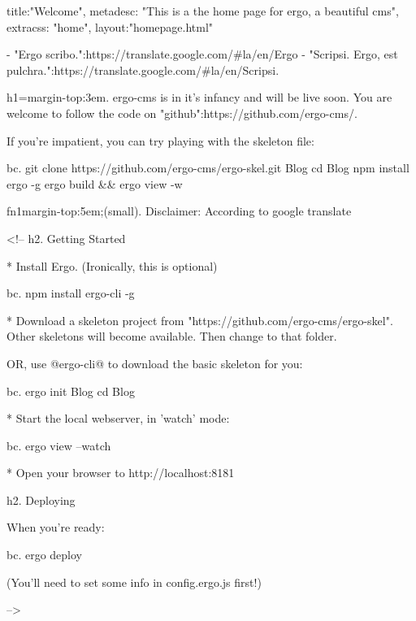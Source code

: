 {
title:"Welcome",
metadesc: "This is a the home page for ergo, a beautiful cms",
extracss: "home",
layout:"homepage.html"
}


- "Ergo scribo.":https://translate.google.com/#la/en/Ergo%
- "Scripsi. Ergo, est pulchra.":https://translate.google.com/#la/en/Scripsi.%


h1={margin-top:3em}. ergo-cms is in it's infancy and will be live soon. You are welcome to follow the code on "github":https://github.com/ergo-cms/.

If you're impatient, you can try playing with the skeleton file:

bc. git clone https://github.com/ergo-cms/ergo-skel.git Blog
cd Blog
npm install ergo -g
ergo build && ergo view -w


fn1{margin-top:5em;}(small). Disclaimer: According to google translate

<!--
h2. Getting Started

* Install Ergo. (Ironically, this is optional)

bc. npm install ergo-cli -g

* Download a skeleton project from "https://github.com/ergo-cms/ergo-skel". Other skeletons will become available. Then change to that folder.

OR, use @ergo-cli@ to download the basic skeleton for you:

bc. ergo init Blog
cd Blog

* Start the local webserver, in 'watch' mode:

bc. ergo view --watch

* Open your browser to http://localhost:8181

h2. Deploying

When you're ready:

bc. ergo deploy

(You'll need to set some info in config.ergo.js first!)

-->